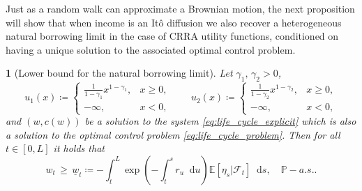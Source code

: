 \documentclass[11pt,oneside,english,reqno,dvipsnames,table]{amsart}
\numberwithin{equation}{section}
\theoremstyle{plain}
\theoremstyle{definition}
\theoremstyle{remark}
\theoremstyle{plain}
\theoremstyle{plain}
\newtheorem{prop}[thm]{\protect\propositionname}
\theoremstyle{plain}
\theoremstyle{plain}
\theoremstyle{plain}
\theoremstyle{plain}
\theoremstyle{plain}
\providecommand{\propositionname}{Proposition}
\newcommand{\cF}{\mathcal{F}}
\newcommand{\EE}{\mathbb{E}}
\newcommand{\PP}{\mathbb{P}}
\newcommand{\dd}{\mathop{}\!\mathrm{d}}
\newcommand{\mbP}{\mathbb{P}}
\numberwithin{thm}{section}
\begin{document}
Just as a random walk can approximate a Brownian motion, the next proposition will show that when income is an It\^o diffusion we also recover a heterogeneous  natural borrowing limit in the case of CRRA utility functions, conditioned on having a unique solution to the associated optimal control problem. 

\begin{prop}[Lower bound for the natural borrowing limit]\label{prop:natural_borrowing_limit}
%
    Let $\gamma_1,\,\gamma_2>0$, 
    \begin{equation}
        u_1(x) \coloneqq \begin{cases}
            \frac{1}{1-\gamma_1}x^{1-\gamma_1}, & x\geq 0,\\
            -\infty, & x<0,
        \end{cases}
        \qquad 
        u_2(x) \coloneqq \begin{cases}
            \frac{1}{1-\gamma_2}x^{1-\gamma_2}, & x\geq 0,\\
            -\infty, & x<0,
        \end{cases}
    \end{equation}
    and $(w,c(w))$ be a solution to the system \eqref{eq:life_cycle_explicit} which is also a solution to the optimal control problem \eqref{eq:life_cycle_problem}. Then for all $t\in [0,L]$ it holds that
    \begin{equation}\label{eq:natural borrowing limit}
           w_t\,  \geq\,  \underline{w}_t\coloneqq -\int_t^L \exp\left(-\int_t^s r_u \dd u\right)\EE[ \eta_s|\cF_t]\dd s, \quad \PP-a.s..
    \end{equation}
%
\end{prop}
%
\end{document}
